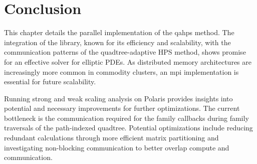 \section{Conclusion}

This chapter details the parallel implementation of the \gls{qahps} method. The integration of the \pforest library, known for its efficiency and scalability, with the communication patterns of the quadtree-adaptive HPS method, shows promise for an effective solver for elliptic PDEs. As distributed memory architectures are increasingly more common in commodity clusters, an \gls{mpi} implementation is essential for future scalability.

Running strong and weak scaling analysis on Polaris provides insights into potential and necessary improvements for further optimizations. The current bottleneck is the communication required for the family callbacks during family traversals of the path-indexed quadtree. Potential optimizations include reducing redundant calculations through more efficient matrix partitioning and investigating non-blocking communication to better overlap compute and communication.

